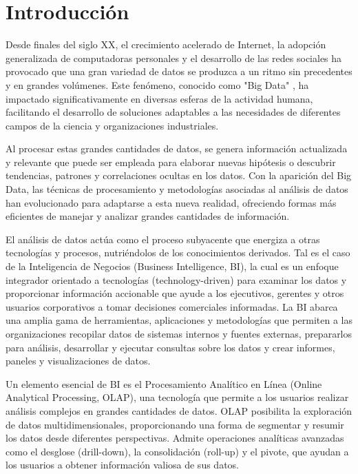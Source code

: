 \chapter*{Introducción}\label{chapter:introduction}

Desde finales del siglo XX, el crecimiento acelerado de Internet, la adopci\'on generalizada de computadoras 
personales y el desarrollo de las redes sociales ha provocado que una gran variedad de datos se produzca a un ritmo 
sin precedentes y en grandes vol\'umenes. 
Este fen\'omeno, conocido como "Big Data" \cite{beyer2012importance}, ha impactado significativamente en diversas 
esferas de la actividad humana, facilitando el desarrollo de soluciones adaptables a las necesidades de diferentes 
campos de la ciencia y organizaciones industriales.

Al procesar estas grandes cantidades de datos, se genera información actualizada y relevante que puede ser empleada 
para elaborar nuevas hipótesis o descubrir tendencias, patrones y correlaciones ocultas en los datos. Con la aparición del 
Big Data, las técnicas de procesamiento y metodologías asociadas al análisis de datos han evolucionado para adaptarse a esta 
nueva realidad, ofreciendo formas más eficientes de manejar y analizar grandes cantidades de información.

El an\'alisis de datos act\'ua como el proceso subyacente que energiza a otras tecnolog\'ias y procesos, nutri\'endolos
de los conocimientos derivados. Tal es el 
caso de la Inteligencia de Negocios (Business Intelligence, BI), la cual es un enfoque integrador orientado a tecnolog\'ias (technology-driven) 
para examinar los datos y proporcionar información accionable que ayude a los ejecutivos, gerentes y otros usuarios corporativos 
a tomar decisiones comerciales informadas. La BI abarca una amplia gama de herramientas, aplicaciones y metodologías 
que permiten a las organizaciones recopilar datos de sistemas internos y fuentes externas, prepararlos para análisis, 
desarrollar y ejecutar consultas sobre los datos y crear informes, paneles y visualizaciones de datos\cite{negash2004business}. 

Un elemento esencial de BI es el Procesamiento Analítico en Línea (Online Analytical Processing, OLAP), una tecnología que 
permite a los usuarios realizar análisis complejos en grandes cantidades de datos. OLAP posibilita la exploración de datos 
multidimensionales, proporcionando una forma de segmentar y resumir los datos desde diferentes perspectivas. Admite 
operaciones analíticas avanzadas como el desglose (drill-down), la consolidación (roll-up) y el pivote, que ayudan a los 
usuarios a obtener información valiosa de sus datos.

